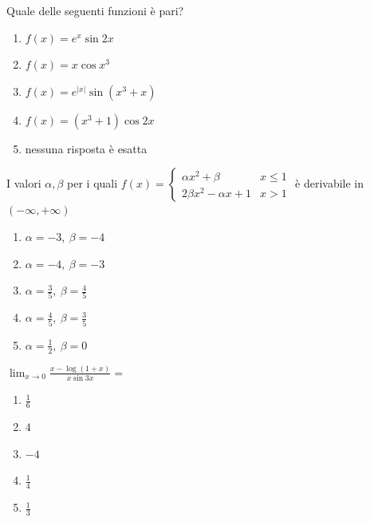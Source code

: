 \begin{quiz}
Quale delle seguenti funzioni è pari?

\begin{enumerate}
\item $f(x)=e^x\sin 2x$
\item $f(x)=x\cos x^3$
\item $f(x)=e^{|x|}\sin(x^3+x)$
\item $f(x)=(x^3+1)\cos 2x$
\item nessuna risposta è esatta
\end{enumerate}
\end{quiz}

\begin{quiz}
I valori $\alpha,\beta$ per i quali $f(x)=\begin{cases}\alpha x^2+\beta&x\le1\\2\beta x^2-\alpha x+1&x>1\end{cases}$ è derivabile in $(-\infty,+\infty)$

\begin{enumerate}
\item $\alpha=-3,\ \beta=-4$
\item $\alpha=-4,\ \beta=-3$
\item $\alpha=\frac35,\ \beta=\frac45$
\item $\alpha=\frac45,\ \beta=\frac35$
\item $\alpha=\frac12,\ \beta=0$
\end{enumerate}
\end{quiz}

\begin{quiz}
$\displaystyle\lim_{x\to0}\frac{x-\log(1+x)}{x\sin 3x}=$

\begin{enumerate}
\item $\frac16$
\item $4$
\item $-4$
\item $\frac14$
\item $\frac13$
\end{enumerate}
\end{quiz}

